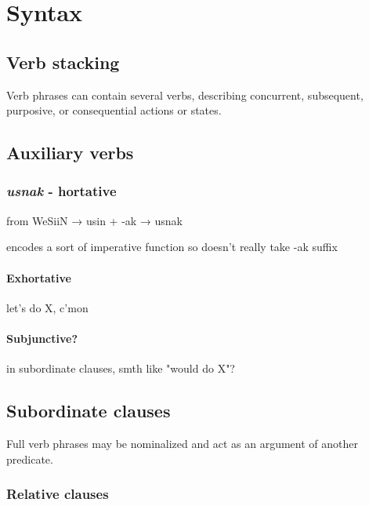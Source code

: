 \documentclass[a4paper,10pt,twoside,openright]{memoir}
\begin{document}
\chapter{Syntax}

\section{Verb stacking}

Verb phrases can contain several verbs, describing concurrent, subsequent, purposive, or consequential actions or states.

\section{Auxiliary verbs}

\subsection{\emph{usnak} - hortative}

from WeSiiN → usin + -ak → usnak

encodes a sort of imperative function so doesn't really take -ak suffix

\subsubsection{Exhortative}

let's do X, c'mon

\subsubsection{Subjunctive?}

in subordinate clauses, smth like "would do X"?

\subsubsection{}

\section{Subordinate clauses}

Full verb phrases may be nominalized and act as an argument of another predicate.

\subsection{Relative clauses}
\end{document}
